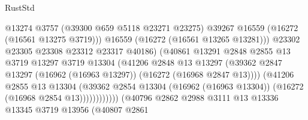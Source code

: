 \begin{lexlean}{RustStd}
\begin{coremodule}
                                              @13274
                                              @3757
                                              (@39300 @659 @5118 @23271 @23275)
                                              @39267
                                              @16559
                                              (@16272 (@16561 @13275 @3719)))
                                            @16559
                                            (@16272 (@16561 @13265 @13281)))
                                          @23302
                                          @23305
                                          @23308
                                          @23312
                                          @23317
                                          @40186)
                                        (@40861
                                          @13291
                                          @2848
                                          @2855
                                          @13
                                          @3719
                                          @13297
                                          @3719
                                          @13304
                                          (@41206
                                            @2848
                                            @13
                                            @13297
                                            (@39362
                                              @2847
                                              @13297
                                              (@16962 (@16963 @13297))
                                              (@16272 (@16968 @2847 @13))))
                                          (@41206
                                            @2855
                                            @13
                                            @13304
                                            (@39362
                                              @2854
                                              @13304
                                              (@16962 (@16963 @13304))
                                              (@16272 (@16968 @2854 @13))))))))))))
                          (@40796
                            @2862
                            @2988
                            @3111
                            @13
                            @13336
                            @13345
                            @3719
                            @13956
                            (@40807
                              @2861

\end{coremodule}
\end{lexlean}

